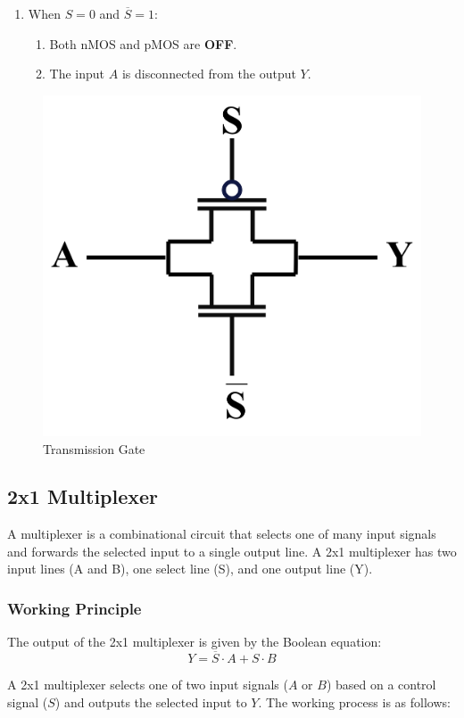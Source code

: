 \documentclass[a4paper,12pt]{article}
\begin{document}
\begin{enumerate}
\begin{enumerate}
			\item When \(S = 0\) and \(\overline{S} = 1\):
			\begin{enumerate}
				\item Both nMOS and pMOS are \textbf{OFF}.
				\item The input \(A\) is disconnected from the output \(Y\).
			\end{enumerate}
		\end{enumerate}
	\end{enumerate}

	
	\begin{figure}[H]
		\centering
		\includegraphics[width=0.32\linewidth]{Images/tgate}
		\caption{ Transmission Gate}
		\label{fig:1}
	\end{figure}
\newpage
	\subsection{2x1 Multiplexer}

A multiplexer is a combinational circuit that selects one of many input signals and forwards the selected input to a single output line. A 2x1 multiplexer has two input lines (A and B), one select line (S), and one output line (Y).

\subsubsection{Working Principle}
The output of the 2x1 multiplexer is given by the Boolean equation:
\[
Y = \overline{S} \cdot A + S \cdot B
\]


	
	A 2x1 multiplexer selects one of two input signals (\(A\) or \(B\)) based on a control signal (\(S\)) and outputs the selected input to \(Y\). The working process is as follows:
	
\end{document}
